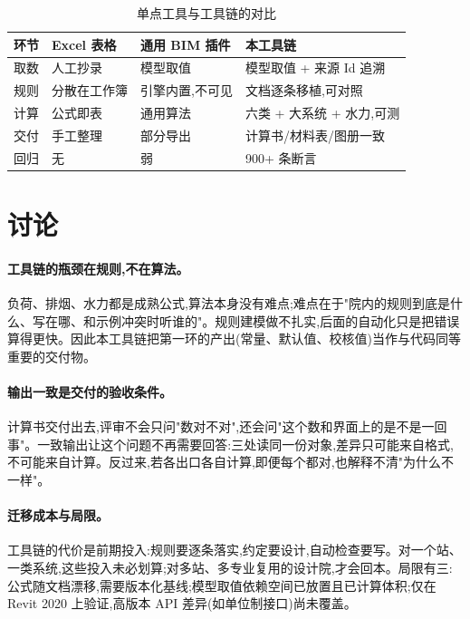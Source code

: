 \documentclass[UTF8,a4paper,zihao=-4]{ctexart}
\begin{document}
\begin{table}[H]
\centering
\caption{单点工具与工具链的对比}\label{tab:compare}
\small
\begin{tabular}{p{2.4cm}p{3.8cm}p{3.8cm}p{4.6cm}}
\toprule
环节 & Excel 表格 & 通用 BIM 插件 & 本工具链 \\
\midrule
取数 & 人工抄录 & 模型取值 & 模型取值 + 来源 Id 追溯 \\
规则 & 分散在工作簿 & 引擎内置,不可见 & 文档逐条移植,可对照 \\
计算 & 公式即表 & 通用算法 & 六类 + 大系统 + 水力,可测 \\
交付 & 手工整理 & 部分导出 & 计算书/材料表/图册一致 \\
回归 & 无 & 弱 & 900+ 条断言 \\
\bottomrule
\end{tabular}
\end{table}

\section{讨论}

\paragraph{工具链的瓶颈在规则,不在算法。}
负荷、排烟、水力都是成熟公式,算法本身没有难点;难点在于"院内的规则到底是什么、写在哪、和示例冲突时听谁的"。规则建模做不扎实,后面的自动化只是把错误算得更快。因此本工具链把第一环的产出(常量、默认值、校核值)当作与代码同等重要的交付物。

\paragraph{输出一致是交付的验收条件。}
计算书交付出去,评审不会只问"数对不对",还会问"这个数和界面上的是不是一回事"。一致输出让这个问题不再需要回答:三处读同一份对象,差异只可能来自格式,不可能来自计算。反过来,若各出口各自计算,即便每个都对,也解释不清"为什么不一样"。

\paragraph{迁移成本与局限。}
工具链的代价是前期投入:规则要逐条落实,约定要设计,自动检查要写。对一个站、一类系统,这些投入未必划算;对多站、多专业复用的设计院,才会回本。局限有三:公式随文档漂移,需要版本化基线;模型取值依赖空间已放置且已计算体积;仅在 Revit 2020 上验证,高版本 API 差异(如单位制接口)尚未覆盖。
\end{document}
